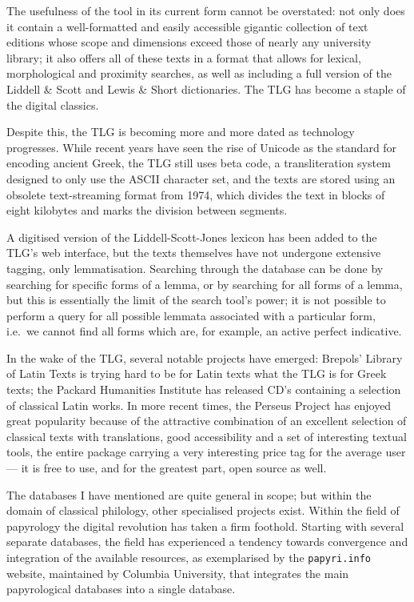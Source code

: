 The usefulness of the tool in its current form cannot be overstated:
not only does it contain a well-formatted and easily accessible
gigantic collection of text editions whose scope and dimensions exceed
those of nearly any university library; it also offers all of these
texts in a format that allows for lexical, morphological and proximity
searches, as well as including a full version of the Liddell \& Scott
and Lewis \& Short dictionaries. The TLG has become a staple of the
digital classics.

Despite this, the TLG is becoming more and more dated as technology
progresses.  While recent years have seen the rise of Unicode as the
standard for encoding ancient Greek, the TLG still uses beta code, a
transliteration system designed to only use the ASCII character set,
and the texts are stored using an obsolete text-streaming format from
1974, which divides the text in blocks of eight kilobytes and marks
the division between segments.

A digitised version of the Liddell-Scott-Jones lexicon has been added
to the TLG's web interface, but the texts themselves have not
undergone extensive tagging, only lemmatisation.  Searching through
the database can be done by searching for specific forms of a lemma,
or by searching for all forms of a lemma, but this is essentially the
limit of the search tool's power; it is not possible to perform a
query for all possible lemmata associated with a particular form,
i.e.\ we cannot find all forms which are, for example, an active
perfect indicative.

In the wake of the TLG, several notable projects have emerged:
Brepols' Library of Latin Texts is trying hard to be for Latin texts
what the TLG is for Greek texts; the Packard Humanities Institute has
released CD's containing a selection of classical Latin works. In more
recent times, the Perseus Project has enjoyed great popularity because
of the attractive combination of an excellent selection of classical
texts with translations, good accessibility and a set of interesting
textual tools, the entire package carrying a very interesting price
tag for the average user — it is free to use, and for the greatest
part, open source as well.

The databases I have mentioned are quite general in scope; but within
the domain of classical philology, other specialised projects
exist. Within the field of papyrology the digital revolution has taken
a firm foothold. Starting with several separate databases, the field
has experienced a tendency towards convergence and integration of the
available resources, as exemplarised by the \texttt{papyri.info} website,
maintained by Columbia University, that integrates the main
papyrological databases into a single database.

